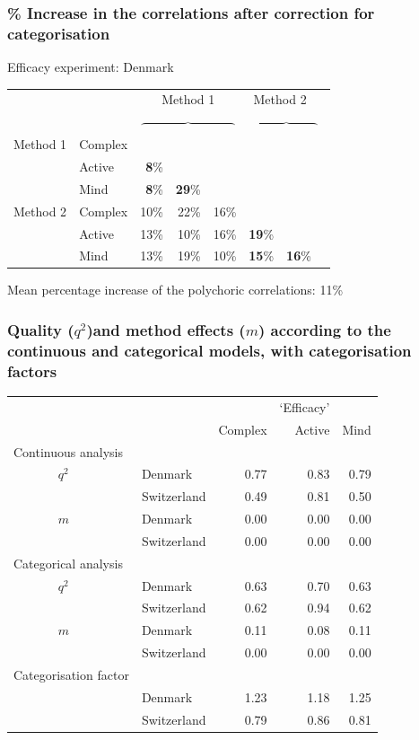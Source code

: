 \documentclass{beamer}
\begin{document}
\begin{frame}
\frametitle{\% Increase in the correlations after correction for categorisation}

Efficacy experiment: Denmark

\begin{tabular}{llrrrrrr}
\hline
 &&\multicolumn{3}{c}{Method 1} & \multicolumn{2}{c}{Method 2}  \\
&&\multicolumn{3}{c}{$\overbrace{\hspace{90pt}}$} & \multicolumn{3}{c}{$\overbrace{\hspace{60pt}}$}\\
 Method 1	& Complex 	& &  &  &  &  & \\
 			& Active 	& \textbf{8}\% &  &  &  & \\
 			& Mind 		& \textbf{8}\% & \textbf{29}\% &  &  & \\
 Method 2	& Complex 	& 10\%& 22\%& 16\%&  & \\
 			& Active 	& 13\%& 10\%& 16\%& \textbf{19}\%  & \\
 			& Mind 		& 13\%& 19\%& 10\%& \textbf{15}\% & \textbf{16}\% &  \\
\hline
\end{tabular}

Mean percentage increase of the polychoric correlations: 11\%


\end{frame}

\begin{frame}
\frametitle{Quality ($q^2$)and method effects ($m$) according to the continuous and categorical models, with categorisation factors}

\begin{footnotesize}\begin{tabular}{lllrrr}
\hline
 &  &  &  & `Efficacy' & \\
	   &  &  & Complex & Active & Mind\\
	   \hline
 \multicolumn{2}{l}{Continuous analysis}\\
 &  $q^2$& Denmark & 0.77 & 0.83 & 0.79\\
 &  & Switzerland & 0.49 & 0.81 & 0.50\\
 &  $m$& Denmark & 0.00 & 0.00 & 0.00\\
 &  & Switzerland & 0.00 & 0.00 & 0.00\\
\multicolumn{2}{l}{Categorical analysis}   &  &  &  & \\
 &  $q^2$& Denmark & 0.63 & 0.70 & 0.63\\
 &  & Switzerland & 0.62 & 0.94 & 0.62\\
 &  $m$& Denmark & 0.11 & 0.08 & 0.11\\
 &  & Switzerland & 0.00 & 0.00 & 0.00\\
\multicolumn{2}{l}{Categorisation factor}    &  &  & \\
 &  & Denmark & 1.23 & 1.18 & 1.25\\
 &  & Switzerland & 0.79 & 0.86 & 0.81\\
\hline
\end{tabular}\end{footnotesize}
\end{frame}
\end{document}
